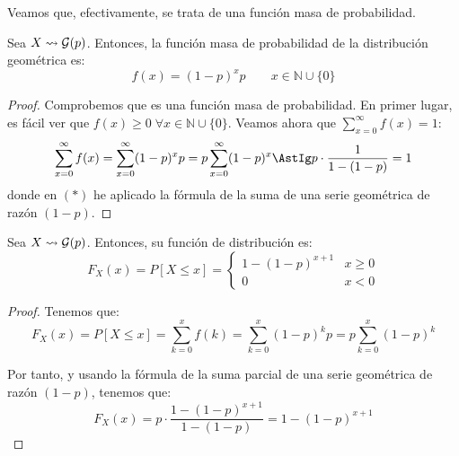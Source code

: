 Veamos que, efectivamente, se trata de una función masa de probabilidad.
\begin{prop}
    Sea $X\leadsto \mathcal{G}(p)$. Entonces, la función masa de probabilidad de la distribución geométrica es:
    \begin{equation*}
        f(x) = (1-p)^{x}p \qquad x\in \mathbb{N}\cup \{0\}
    \end{equation*}
\end{prop}
\begin{proof}
    Comprobemos que es una función masa de probabilidad. En primer lugar, es fácil ver que $f(x)\geq 0\;\forall x\in \mathbb{N}\cup \{0\}$. Veamos ahora que $\sum\limits_{x=0}^\infty f(x)=1$:
    \begin{equation*}
        \sum_{x=0}^\infty f(x)
        = \sum_{x=0}^\infty (1-p)^{x}p
        = p\sum_{x=0}^\infty (1-p)^{x}
        \AstIg p\cdot \frac{1}{1-(1-p)} = 1
    \end{equation*}
    donde en $(\ast)$ he aplicado la fórmula de la suma de una serie geométrica de razón $(1-p)$.
\end{proof}


\begin{prop}
    Sea $X\leadsto \mathcal{G}(p)$. Entonces, su función de distribución es:
    \begin{equation*}
        F_X(x) = P[X\leq x] = \begin{cases}
            1-(1-p)^{x+1} & x\geq 0 \\
            0 & x<0
        \end{cases}
    \end{equation*}
\end{prop}
\begin{proof}
    Tenemos que:
    \begin{equation*}
        F_X(x) = P[X\leq x] = \sum_{k=0}^x f(k) = \sum_{k=0}^x (1-p)^{k}p = p\sum_{k=0}^x (1-p)^{k}
    \end{equation*}

    Por tanto, y usando la fórmula de la suma parcial de una serie geométrica de razón $(1-p)$, tenemos que:
    \begin{equation*}
        F_X(x) = p\cdot \frac{1-(1-p)^{x+1}}{1-(1-p)} = 1-(1-p)^{x+1}
    \end{equation*}
\end{proof}

